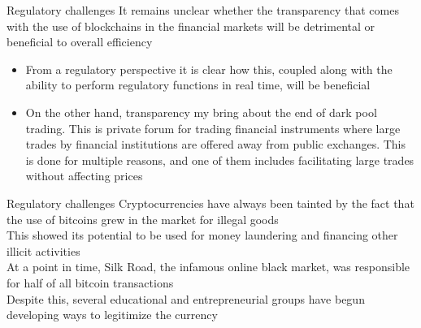 \documentclass[10pt]{beamer}
\begin{document}
\begin{frame}{Regulatory challenges}
	It remains unclear whether the transparency that comes with the use of blockchains in the financial markets will be detrimental or beneficial to overall efficiency
	\begin{itemize}
		\item From a regulatory perspective it is clear how this, coupled along with the ability to perform regulatory functions in real time, will be beneficial
		\item On the other hand, transparency my bring about the end of dark pool trading. This is private forum for trading financial instruments where large trades by financial institutions are offered away from public exchanges. This is done for multiple reasons, and one of them includes facilitating large trades without affecting prices
	\end{itemize}
\end{frame}


\begin{frame}{Regulatory challenges}
	Cryptocurrencies have always been tainted by the fact that the use of bitcoins grew in the market for illegal goods\\ \vspace{3mm}
	This showed its potential to be used for money laundering and financing other illicit activities \\ \vspace{3mm} %
	At a point in time, Silk Road, the infamous online black market, was responsible for half of all bitcoin transactions\\ \vspace{3mm}
	Despite this, several educational and entrepreneurial groups have begun developing ways to legitimize the currency
\end{frame}

\end{document}
